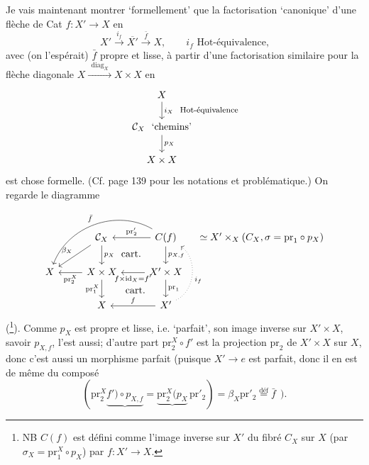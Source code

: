 Je vais maintenant montrer `formellement' que la factorisation `canonique' d'une flèche de Cat $f : X' \longrightarrow X$ en
\[ X' \xrightarrow{i_f} \overline{X'} \xrightarrow{\bar{f}} X, \qquad i_f \text{ Hot-équivalence,} \]
avec (on l'espérait) $\bar{f}$ propre et lisse, à partir d'une factorisation similaire pour la flèche diagonale $X \xrightarrow{\ \ \mathrm{diag}_X\ \ } X \times X$ en
\[
\begin{tikzcd}
X \arrow[d, "i_X\ \ \text{\footnotesize Hot-équivalence}"] \\
\mathcal{C}_X\ \ \text{`chemins'} \arrow[d, "p_X"] \\
X \times X
\end{tikzcd}
\]
est chose formelle. (Cf. page 139 pour les notations et problématique.) On regarde le diagramme
\[
\begin{tikzcd}
 & \mathcal{C}_X \arrow[d, "p_X"] \arrow[dl, "\beta_X"'] \arrow[dr, phantom, "\text{cart.}"] & C(f) \arrow[l, "\mathrm{pr}'_2"'] \arrow[d, "p_{X,f}"] \arrow[dll, bend right=50, "\bar{f}"'] & [-1.5em] \simeq X' \times_X (C_X, \sigma = \mathrm{pr}_1 \circ p_X) \\ %
X & X \times X \arrow[l, "\mathrm{pr}_2^X"] \arrow[d, "\mathrm{pr}_1^X"'] \arrow[dr, phantom, "\text{cart.}"] & X' \times X \arrow[l, "f \times \mathrm{id}_X = f'"] \arrow[d, "\mathrm{pr}_1"] & \\
 & X & X' \arrow[l, "f"'] \arrow[uu, bend right=60, dotted, "i_f"'] &
\end{tikzcd}
\]
(\footnote[40]{NB $C(f)$ est défini comme l'image inverse sur $X'$ du fibré $C_X$ sur $X$ (par $\sigma_X = \mathrm{pr}_1^X \circ p_X$) par $f : X' \longrightarrow X$.}). Comme $p_X$ est propre et lisse, i.e. `parfait', son image inverse sur $X' \times X$, savoir $p_{X,f}$, l'est aussi; d'autre part $\mathrm{pr}_2^X \circ f'$ est la
projection $\mathrm{pr}_2$ de $X' \times X$ sur $X$, donc c'est aussi un morphisme parfait (puisque $X' \longrightarrow e$ est parfait, donc il en est de même du composé
\[ (\mathrm{pr}_2^X \underbrace{f') \circ p_{X,f}} = \underbrace{\mathrm{pr}_2^X(p_X}\, \mathrm{pr}'_2) = \beta_X \mathrm{pr}'_2 \overset{\text{déf}}{=} \bar{f} \ \ ). \]

